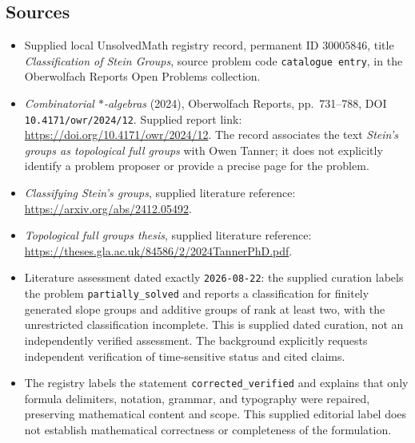 \documentclass[11pt]{article}
\begin{document}
\subsection{Sources}
\begin{itemize}
\item Supplied local UnsolvedMath registry record, permanent ID \(30005846\), title \emph{Classification of Stein Groups}, source problem code \texttt{catalogue entry}, in the Oberwolfach Reports Open Problems collection.
\item \emph{Combinatorial \(*\)-algebras} (2024), Oberwolfach Reports, pp.~731--788, DOI \texttt{10.4171/owr/2024/12}. Supplied report link: \url{https://doi.org/10.4171/owr/2024/12}. The record associates the text \emph{Stein's groups as topological full groups} with Owen Tanner; it does not explicitly identify a problem proposer or provide a precise page for the problem.
\item \emph{Classifying Stein's groups}, supplied literature reference: \url{https://arxiv.org/abs/2412.05492}.
\item \emph{Topological full groups thesis}, supplied literature reference: \url{https://theses.gla.ac.uk/84586/2/2024TannerPhD.pdf}.
\item Literature assessment dated exactly \texttt{2026-08-22}: the supplied curation labels the problem \texttt{partially\_solved} and reports a classification for finitely generated slope groups and additive groups of rank at least two, with the unrestricted classification incomplete. This is supplied dated curation, not an independently verified assessment. The background explicitly requests independent verification of time-sensitive status and cited claims.
\item The registry labels the statement \texttt{corrected\_verified} and explains that only formula delimiters, notation, grammar, and typography were repaired, preserving mathematical content and scope. This supplied editorial label does not establish mathematical correctness or completeness of the formulation.
\end{itemize}
\end{document}
